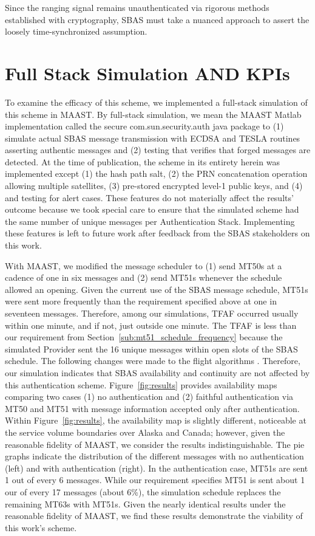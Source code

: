 \documentclass[letterpaper,times]{IONconf/IONconf}
\begin{document}
	Since the ranging signal remains unauthenticated via rigorous methods established with cryptography, SBAS must take a nuanced approach to assert the loosely time-synchronized assumption.

\section{Full Stack Simulation AND KPIs} \label{sec:full_stack_simulation}

	To examine the efficacy of this scheme, we implemented a full-stack simulation of this scheme in MAAST.
	By full-stack simulation, we mean the MAAST Matlab implementation called the secure com.sun.security.auth java package to (1) simulate actual SBAS message transmission with ECDSA and TESLA routines asserting authentic messages and (2) testing that verifies that forged messages are detected.
	At the time of publication, the scheme in its entirety herein was implemented except (1) the hash path salt, (2) the PRN concatenation operation allowing multiple satellites, (3) pre-stored encrypted level-1 public keys, and (4) and testing for alert cases.
	These features do not materially affect the results' outcome because we took special care to ensure that the simulated scheme had the same number of unique messages per Authentication Stack.
	Implementing these features is left to future work after feedback from the SBAS stakeholders on this work.

	With MAAST, we modified the message scheduler to (1) send MT50s at a cadence of one in six messages and (2) send MT51s whenever the schedule allowed an opening.
	Given the current use of the SBAS message schedule, MT51s were sent more frequently than the requirement specified above at one in seventeen messages.
	Therefore, among our simulations, TFAF occurred usually within one minute, and if not, just outside one minute.
	The TFAF is less than our requirement from Section~\ref{sub:mt51_schedule_frequency} because the simulated Provider sent the 16 unique messages within open slots of the SBAS schedule.
	The following changes were made to the flight algorithms \cite{}.
	Therefore, our simulation indicates that SBAS availability and continuity are not affected by this authentication scheme.
	Figure~\ref{fig:results} provides availability maps comparing two cases (1) no authentication and (2) faithful authentication via MT50 and MT51 with message information accepted only after authentication.
	Within Figure~\ref{fig:results}, the availability map is slightly different, noticeable at the service volume boundaries over Alaska and Canada; however, given the reasonable fidelity of MAAST, we consider the results indistinguishable.
	The pie graphs indicate the distribution of the different messages with no authentication (left) and with authentication (right).
	In the authentication case, MT51s are sent 1 out of every 6 messages.
	While our requirement specifies MT51 is sent about 1 our of every 17 messages (about 6\%), the simulation schedule replaces the remaining MT63s with MT51s.
	Given the nearly identical results under the reasonable fidelity of MAAST, we find these results demonstrate the viability of this work's scheme.
\end{document}
